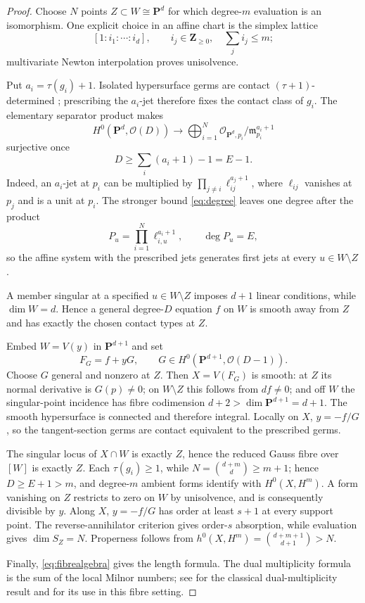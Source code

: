 \documentclass[11pt]{article}
\theoremstyle{remark}
\newcommand{\PP}{\mathbf P}
\newcommand{\m}{\mathfrak m}
\newcommand{\cO}{\mathcal O}
\begin{document}
\begin{proof}
Choose \(N\) points \(Z\subset W\cong\PP^d\) for which degree-\(m\)
evaluation is an isomorphism.  One explicit choice in an affine chart is
the simplex lattice
\[
 [1:i_1:\cdots:i_d],
 \qquad i_j\in\mathbf Z_{\ge0},\quad \sum_j i_j\le m;
\]
multivariate Newton interpolation proves unisolvence.

Put \(a_i=\tau(g_i)+1\).  Isolated hypersurface germs are contact
\((\tau+1)\)-determined \cite[Corollary~2.24]{GLS2007}; prescribing the
\(a_i\)-jet therefore fixes the contact class of \(g_i\).  The elementary
separator product makes
\[
 H^0(\PP^d,\cO(D))\longrightarrow
 \bigoplus_{i=1}^N\cO_{\PP^d,p_i}/\m_{p_i}^{a_i+1}
\]
surjective once
\[
 D\ge\sum_i(a_i+1)-1=E-1.
\]
Indeed, an \(a_i\)-jet at \(p_i\) can be multiplied by
\(\prod_{j\ne i}\ell_{ij}^{a_j+1}\), where \(\ell_{ij}\) vanishes at
\(p_j\) and is a unit at \(p_i\).  The stronger bound
\eqref{eq:degree} leaves one degree after the product
\[
 P_u=\prod_{i=1}^N\ell_{i,u}^{a_i+1},
 \qquad \deg P_u=E,
\]
so the affine system with the prescribed jets generates first jets at
every \(u\in W\setminus Z\).

A member singular at a specified \(u\in W\setminus Z\) imposes \(d+1\)
linear conditions, while \(\dim W=d\).  Hence a general degree-\(D\)
equation \(f\) on \(W\) is smooth away from \(Z\) and has exactly the chosen
contact types at \(Z\).

Embed \(W=V(y)\) in \(\PP^{d+1}\) and set
\[
 F_G=f+yG,
 \qquad G\in H^0(\PP^{d+1},\cO(D-1)).
\]
Choose \(G\) general and nonzero at \(Z\).  Then \(X=V(F_G)\) is smooth: at
\(Z\) its normal derivative is \(G(p)\ne0\); on \(W\setminus Z\) this
follows from \(df\ne0\); and off \(W\) the singular-point incidence has
fibre codimension \(d+2>\dim\PP^{d+1}=d+1\).  The smooth hypersurface is
connected and therefore integral.  Locally on \(X\), \(y=-f/G\), so the
tangent-section germs are contact equivalent to the prescribed germs.

The singular locus of \(X\cap W\) is exactly \(Z\), hence the reduced Gauss
fibre over \([W]\) is exactly \(Z\).  Each \(\tau(g_i)\ge1\), while
\(N=\binom{d+m}{d}\ge m+1\); hence \(D\ge E+1>m\), and degree-\(m\) ambient
forms identify with \(H^0(X,H^m)\).  A form vanishing on \(Z\) restricts to
zero on \(W\) by unisolvence, and is consequently divisible by \(y\).
Along \(X\), \(y=-f/G\) has order at least \(s+1\) at every support point.  The
reverse-annihilator criterion gives order-\(s\) absorption, while evaluation
gives \(\dim S_Z=N\).  Properness follows from
\(h^0(X,H^m)=\binom{d+m+1}{d+1}>N\).

Finally, \eqref{eq:fibrealgebra} gives the length formula.  The dual
multiplicity formula is the sum of the local Milnor numbers; see
\cite{Parusinski1991} for the classical dual-multiplicity result and
\cite{ErikssonGauss2026,ErikssonDual2026} for its use in this fibre
setting.
\end{proof}
\end{document}
